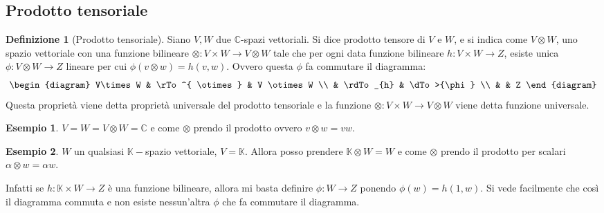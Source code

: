 \documentclass[11pt]{article}
\theoremstyle{plain}
\theoremstyle{definition}
\newtheorem{defn}{Definizione}[section]
\newtheorem{exmp}{Esempio}[section]
\theoremstyle{remark}
\newcommand{\C}{\mathbb{C}}
\newcommand{\K}{\mathbb{K}}
\newcommand{\tridiag}[6]{
	  \begin{diagram}
	  #1 & \rTo^{#2}  & #3        \\
	     & \rdTo_{#6} & \dTo>{#4}   \\
	     &          & #5
	  \end{diagram}
}
\begin{document}
\subsection{Prodotto tensoriale}

\begin{defn}[Prodotto tensoriale]
   Siano $V, W$ due $\mathbb{C}$-spazi vettoriali. Si dice prodotto tensore di $V$ e $W$, 
   e si indica come $V\otimes W$, uno spazio vettoriale con una funzione bilineare 
   $\otimes: V \times W \to V\otimes W$ tale che per ogni data funzione bilineare $h: V\times W \to  Z$,
   esiste unica $\phi: V\otimes W \to Z$ lineare per cui $\phi(v \otimes w)=h(v,w)$. Ovvero questa $\phi$ fa commutare il diagramma:
   \[\tridiag{V\times W}{ \otimes }{V \otimes W}{\phi}{Z}{h}\]
   Questa proprietà viene detta proprietà universale del prodotto tensoriale e la funzione $\otimes: V \times W \to V\otimes W$
   viene detta funzione universale.
\label{defn:prodotto tensoriale}
\end{defn}

\begin{exmp} $V=W=V\otimes W = \C$ e come $\otimes$ prendo il prodotto ovvero $v\otimes w=vw$.
\end{exmp}
\begin{exmp} $W$ un qualsiasi $\K-$spazio vettoriale, $V=\K$. Allora posso prendere $\K\otimes W = W$ e come $\otimes$ prendo il prodotto per scalari $\alpha\otimes w=\alpha w$.

Infatti se $h:\K\times W\to Z$ è una funzione bilineare, allora mi basta definire $\phi:W\to Z$ ponendo $\phi(w) = h(1, w)$. Si vede facilmente
che così il diagramma commuta e non esiste nessun'altra $\phi$ che fa commutare il diagramma.
\end{exmp}
\end{document}
